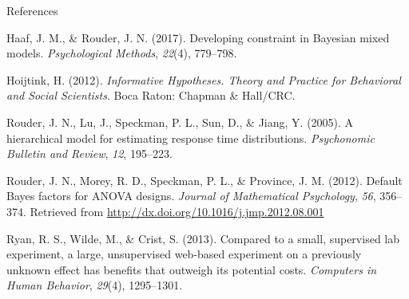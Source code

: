 \documentclass[ignorenonframetext,t]{beamer}
\begin{document}
\begin{frame}{References}

\scriptsize  \setlength{\parindent}{-0.5in} \setlength{\leftskip}{0.5in}

\hypertarget{refs}{}
\hypertarget{ref-Haaf:Rouder:2017}{}
Haaf, J. M., \& Rouder, J. N. (2017). Developing constraint in Bayesian
mixed models. \emph{Psychological Methods}, \emph{22}(4), 779--798.

\hypertarget{ref-Hoijtink:2012}{}
Hoijtink, H. (2012). \emph{Informative Hypotheses. Theory and Practice
for Behavioral and Social Scientists}. Boca Raton: Chapman \& Hall/CRC.

\hypertarget{ref-Rouder:etal:2005a}{}
Rouder, J. N., Lu, J., Speckman, P. L., Sun, D., \& Jiang, Y. (2005). A
hierarchical model for estimating response time distributions.
\emph{Psychonomic Bulletin and Review}, \emph{12}, 195--223.

\hypertarget{ref-Rouder:etal:2012}{}
Rouder, J. N., Morey, R. D., Speckman, P. L., \& Province, J. M. (2012).
Default Bayes factors for ANOVA designs. \emph{Journal of Mathematical
Psychology}, \emph{56}, 356--374. Retrieved from
\url{http://dx.doi.org/10.1016/j.jmp.2012.08.001}

\hypertarget{ref-Ryan:etal:2013}{}
Ryan, R. S., Wilde, M., \& Crist, S. (2013). Compared to a small,
supervised lab experiment, a large, unsupervised web-based experiment on
a previously unknown effect has benefits that outweigh its potential
costs. \emph{Computers in Human Behavior}, \emph{29}(4), 1295--1301.

\end{frame}
\end{document}
